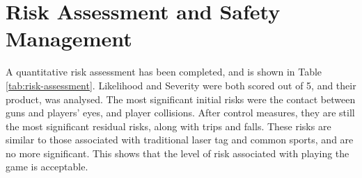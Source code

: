 \documentclass{report_template_oxford}
\begin{document}
\newpage
\section{Risk Assessment and Safety Management}
\label{risk-assessment}

A quantitative risk assessment has been completed, and is shown in Table \ref{tab:risk-assessment}. Likelihood and Severity were both scored out of 5, and their product,  was analysed. The most significant initial risks were the contact between guns and players' eyes, and player collisions. After control measures, they are still the most significant residual risks, along with trips and falls. These risks are similar to those associated with traditional laser tag and common sports, and are no more significant. This shows that the level of risk associated with playing the game is acceptable.
\end{document}
